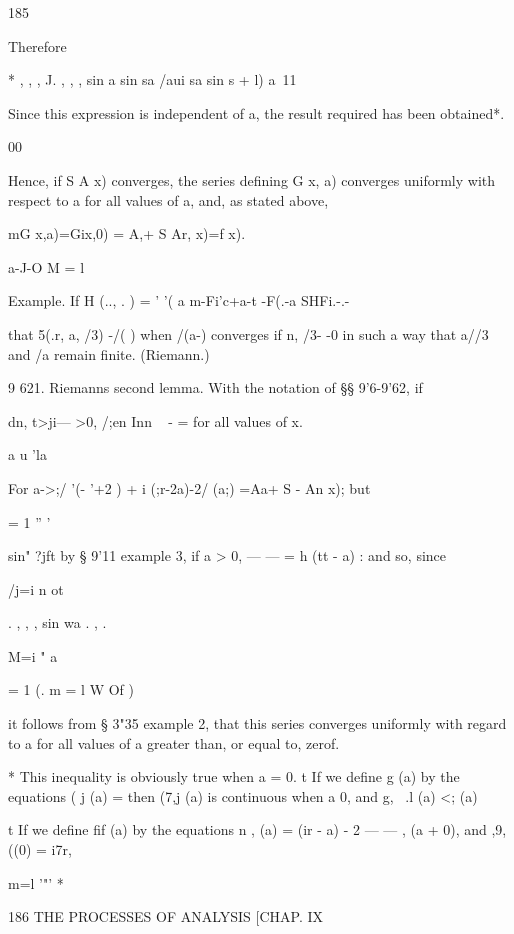 185 



Therefore 



* ,  , , J. , , ,  sin a sin sa /aui sa sin  s + l) a\ 11 






Since this expression is independent of a, the result required has been obtained*. 

00 

Hence, if S A   x) converges, the series defining G  x, a) converges 
uniformly with respect to a for all values of a, and, as stated above, 
\ \ {mG x,a)=Gix,0) = A,+ S Ar, x)=f x). 

a-J-O M = l 

Example. If H (..,  .  ) = ' '(  a m-Fi'c+a-t -F(.-a SHFi.-.-       

that 5(.r, a, /3) -/( ) when /(a-) converges if n, /3- -0 in such a way that a//3 and  /a 
remain finite. (Riemann.) 

9 621. Riemanns second lemma. With the notation of §§ 9'6-9'62, if 

dn, t>ji— >0,  /;en Inn ~  -  = for all values of x. 

a u 'la 

For  a->;/ '(- '+2 ) + i (;r-2a)-2/ (a;) =Aa+ S  - An x); but 

  = 1 '' '  

  sin" ?jft 
by § 9'11 example 3, if a > 0,   —   — = h (tt - a) : and so, since 

/j=i n ot 

. , ,  , sin wa . , . 

M=i " a 

  = 1 (. m = l W Of ) 

it follows from § 3"35 example 2, that this series converges uniformly with 
regard to a for all values of a greater than, or equal to, zerof. 



* This inequality is obviously true when a = 0. 
t If we define g  (a) by the equations ( j (a) = 
then (7,j (a) is continuous when a   0, and g, \  .l (a)   <;  (a) 



t If we define fif  (a) by the equations n ,  (a) =   (ir - a) - 2 —   — , (a + 0), and ,9,((0) = i7r, 

m=l '"' * 



186 THE PROCESSES OF ANALYSIS [CHAP. IX 

}
